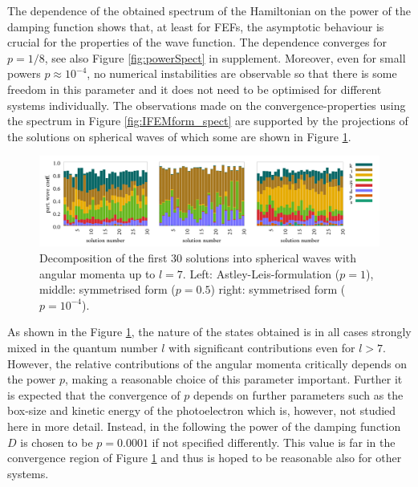 The dependence of the obtained spectrum of the Hamiltonian on the power of the damping function shows that, at least for FEFs, the asymptotic behaviour is crucial for the properties of the wave function. 
The dependence converges for $p=1/8$, see also Figure \ref{fig:powerSpect} in supplement.
Moreover, even for small powers $p\approx 10^{-4}$, no numerical instabilities are observable so that there is some freedom in this parameter and it does not need to be optimised for different systems individually.
The observations made on the convergence-properties using the spectrum in Figure \ref{fig:IFEMform_spect} are supported by the projections of the solutions on spherical waves of which some are shown in Figure \ref{fig:IFEMform_project}.

\begin{figure}
\includegraphics[width=\textwidth]{Figures/Ifem_forms}
\caption{Decomposition of the first 30 solutions into spherical waves with angular momenta up to $l=7$.
Left: Astley-Leis-formulation ($p=1$), middle: symmetrised form ($p=0.5$) right: symmetrised form ($p=10^{-4}$).}
\label{fig:IFEMform_project}
\end{figure}

As shown in the Figure \ref{fig:IFEMform_project}, the nature of the states obtained is in all cases strongly mixed in the quantum number $l$ with significant contributions even for $l>7$.
However, the relative contributions of the angular momenta critically depends on the power $p$, making a reasonable choice of this parameter important.
Further it is expected that the convergence of $p$ depends on further parameters such as the box-size and kinetic energy of the photoelectron which is, however, not studied here in more detail.
Instead, in the following the power of the damping function $D$ is chosen to be $p=0.0001$ if not specified differently.
This value is far in the convergence region of Figure \ref{fig:IFEMform_project} and thus is hoped to be reasonable also for other systems.

